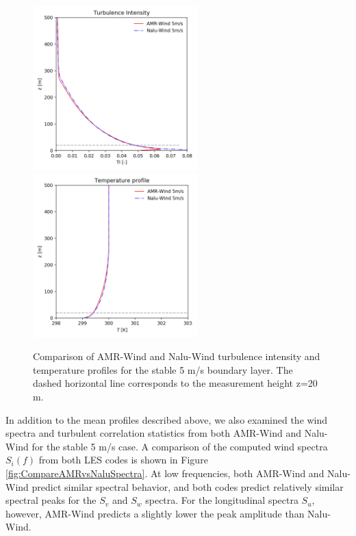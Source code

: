 \begin{figure} [hbt!]
  \centering
  \includegraphics[width=2.5in]{figures/Compare_AMRWind_NaluWind/AMRWind_NaluWind_stable_05ms_mesh2p5_2p5_2p5_TI.png}
  \includegraphics[width=2.5in]{figures/Compare_AMRWind_NaluWind/AMRWind_NaluWind_stable_05ms_mesh2p5_2p5_2p5_T.png}
  \caption{\label{fig:CompareAMRvsNaluWind_TTI} Comparison of AMR-Wind
    and Nalu-Wind turbulence intensity and temperature profiles for
    the stable 5 m/s boundary layer. The dashed horizontal line
    corresponds to the measurement height z=20 m.}
\end{figure}

In addition to the mean profiles described above, we also examined the
wind spectra and turbulent correlation statistics from both AMR-Wind
and Nalu-Wind for the stable 5 m/s case.  A comparison of the computed
wind spectra $S_i(f)$ from both LES codes is shown in Figure
\ref{fig:CompareAMRvsNaluSpectra}.  At low frequencies, both AMR-Wind
and Nalu-Wind predict similar spectral behavior, and both codes
predict relatively similar spectral peaks for the $S_v$ and $S_w$
spectra.  For the longitudinal spectra $S_u$, however, AMR-Wind
predicts a slightly lower the peak amplitude than Nalu-Wind.

